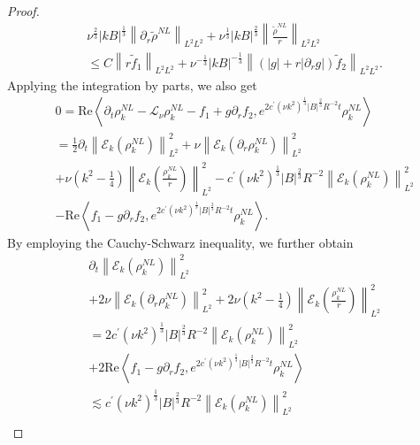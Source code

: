 \documentclass[final, 12pt,reqno]{amsart}
\numberwithin{equation}{section}
\begin{document}
\begin{proof}
\begin{equation}
      \begin{aligned}
           &\nu^{\frac{2}{3}}|k B|^{\frac{1}{3}}\left\|\partial_r\tilde{\rho}^{NL}\right\|_{L^2L^2}+\nu^{\frac{1}{3}}|k B|^{\frac{2}{3}}\left\|\frac{\tilde{\rho}^{NL}}{r}\right\|_{L^2L^2}\\
           &\leq C\left\|r \tilde{f}_1\right\|_{L^2L^2}+\nu^{-\frac{1}{3}}|k B|^{-\frac{1}{3}}\left\|(|g|+r|\partial_{r}g|)\tilde{f}_2\right\|_{L^2L^2}.
         \end{aligned}
           \end{equation}
        Applying the integration by parts, we also get
    $$
    \begin{aligned}
        & 0=\text{Re}\left\langle\partial_t \rho_{k}^{NL}-\mathcal{L}_\nu\rho_{k}^{NL}-f_1+g \partial_rf_2, e^{2 c^{\prime}\left(\nu k^2\right)^{\frac{1}{3}}|B|^{\frac{2}{3}} R^{-2} t} \rho_k^{NL}\right\rangle \\
        & =\frac{1}{2} \partial_t\left\|\mathcal{E}_k(\rho_k^{NL})\right\|_{L^2}^2+\nu\left\|\mathcal{E}_k(\partial_r \rho_k^{NL})\right\|_{L^2}^2\\
        &+\nu\left(k^2-\frac{1}{4}\right)\left\|\mathcal{E}_k (\frac{\rho_k^{NL}}{r})\right\|_{L^2}^2
        -c^{\prime}\left(\nu k^2\right)^{\frac{1}{3}}|B|^{\frac{2}{3}} R^{-2}\left\|\mathcal{E}_k (\rho_k^{NL})\right\|_{L^2}^2\\
        &-\text{Re}\left\langle f_1-g \partial_r f_2, e^{2 c^{\prime}\left(\nu k^2\right)^{\frac{1}{3}}|B|^{\frac{2}{3}} R^{-2} t} \rho_k^{NL}\right\rangle.
    \end{aligned}
    $$
    By employing the Cauchy-Schwarz inequality, we further obtain
        $$
    \begin{aligned}
        & \partial_t\left\|\mathcal{E}_k(\rho_k^{NL})\right\|_{L^2}^2\\
   &+2 \nu\left\|\mathcal{E}_k(\partial_r \rho_k^{NL})\right\|_{L^2}^2+2 \nu\left(k^2-\frac{1}{4}\right)\left\|\mathcal{E}_k (\frac{\rho_k^{NL}}{r})\right\|_{L^2}^2 \\
        & =2 c^{\prime}\left(\nu k^2\right)^{\frac{1}{3}}|B|^{\frac{2}{3}} R^{-2}\left\|\mathcal{E}_k (\rho_k^{NL})\right\|_{L^2}^2\\
   &+2 \text{Re}\left\langle f_1-g \partial_r f_2, e^{2 c^{\prime}\left(\nu k^2\right)^{\frac{1}{3}}|B|^{\frac{2}{3}} R^{-2} t} \rho_k^{NL}\right\rangle \\
        & \lesssim c^{\prime}\left(\nu k^2\right)^{\frac{1}{3}}|B|^{\frac{2}{3}} R^{-2}\left\|\mathcal{E}_k (\rho_k^{NL})\right\|_{L^2}^2\\

\end{aligned}$$
\end{proof}
\end{document}
